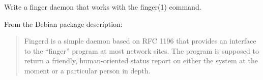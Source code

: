 \begin{Exercise}[title={*Finger daemon},difficulty=8]
\label{ex:finger}
\Question
Write a finger daemon that works with the finger(1) command.

From the Debian package description:
\begin{quote}
Fingerd is a simple daemon based on RFC 1196 \cite{RFC1196} that provides an interface to the
``finger'' program at most network sites.  The program is supposed to return a
friendly, human-oriented status report on either the system at the moment or a
particular person in depth.
\end{quote}

\end{Exercise}
